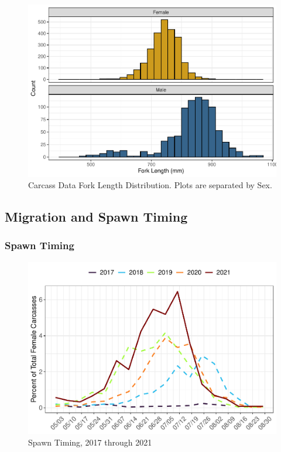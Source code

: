\documentclass[
]{book}
\theoremstyle{definition}
\theoremstyle{definition}
\theoremstyle{definition}
\theoremstyle{definition}
\theoremstyle{remark}
\begin{document}
\begin{figure}
\centering
\includegraphics{_main_files/figure-latex/carcassFL-fig-1.pdf}
\caption{\label{fig:carcassFL-fig}Carcass Data Fork Length Distribution. Plots are separated by Sex.}
\end{figure}

\hypertarget{migration-and-spawn-timing}{%
\subsection{Migration and Spawn Timing}\label{migration-and-spawn-timing}}

\hypertarget{spawn-timing}{%
\subsubsection{Spawn Timing}\label{spawn-timing}}

\begin{figure}
\centering
\includegraphics{_main_files/figure-latex/spawntiming-fig-1.pdf}
\caption{\label{fig:spawntiming-fig}Spawn Timing, 2017 through 2021}
\end{figure}
\end{document}
